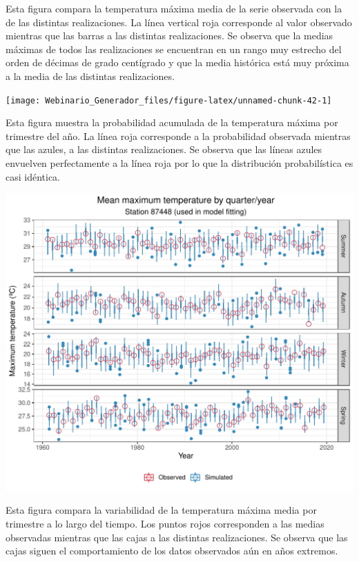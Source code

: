 \documentclass[
]{article}
\begin{document}
Esta figura compara la temperatura máxima media de la serie observada con la de las distintas realizaciones. La línea vertical roja corresponde al valor observado mientras que las barras a las distintas realizaciones. Se observa que la medias máximas de todos las realizaciones se encuentran en un rango muy estrecho del orden de décimas de grado centígrado y que la media histórica está muy próxima a la media de las distintas realizaciones.

\begin{center}\texttt{[image: Webinario\_Generador\_files/figure-latex/unnamed-chunk-42-1]} \end{center}

Esta figura muestra la probabilidad acumulada de la temperatura máxima por trimestre del año. La línea roja corresponde a la probabilidad observada mientras que las azules, a las distintas realizaciones. Se observa que las líneas azules envuelven perfectamente a la línea roja por lo que la distribución probabilística es casi idéntica.

\begin{center}\includegraphics{Webinario_Generador_files/figure-latex/unnamed-chunk-43-1} \end{center}

Esta figura compara la variabilidad de la temperatura máxima media por trimestre a lo largo del tiempo. Los puntos rojos corresponden a las medias observadas mientras que las cajas a las distintas realizaciones. Se observa que las cajas siguen el comportamiento de los datos observados aún en años extremos.
\end{document}
